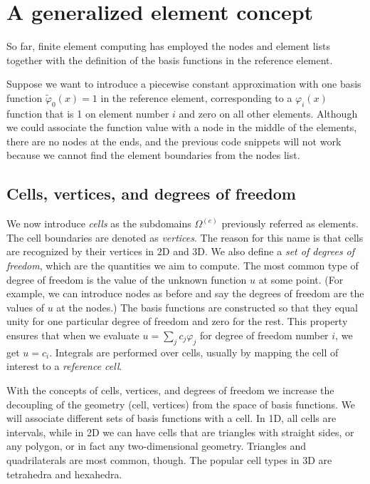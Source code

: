 \documentclass[../main.tex]{subfiles}
\begin{document}
	\chapter{A generalized element concept}
	\label{chap:chap_6}
	\noindent So far, finite element computing has employed the nodes and element lists
	together with the definition of the basis functions in the reference element.
	
	Suppose we want to introduce a piecewise constant approximation with one basis function $\tilde{\varphi}_{0}(x)=1$ in the reference element, corresponding to a $\varphi_{i}(x)$ function that is 1 on element number $i$ and zero on all other elements. Although we could associate the function value with a node in the middle of the elements, there are no nodes at the ends, and the previous code snippets will not work because we cannot find the element boundaries from the nodes list.
	\section[Cells, vertices, and degrees of freedom]{Cells, vertices, and degrees of freedom}
	\label{sec:sec_6_1}
	We now introduce \textit{cells} as the subdomains $\Omega^{(e)}$ previously referred as elements. The cell boundaries are denoted as \textit{vertices}. The reason for this name is that cells are recognized by their vertices in $2 \mathrm{D}$ and 3D. We also define a \textit{set of degrees of freedom}, which are the quantities we aim to compute. The most common type of degree of freedom is the value of the unknown function $u$ at some point. (For example, we can introduce nodes as before and say the degrees of freedom are the values of $u$ at the nodes.) The basis functions are constructed so that they equal unity for one particular degree of freedom and zero for the rest. This property ensures that when we evaluate $u=\sum_{j} c_{j} \varphi_{j}$ for degree of freedom number $i$, we get $u=c_{i}$. Integrals are performed over cells, usually by mapping the cell of interest to a \textit{reference cell}.
	
	With the concepts of cells, vertices, and degrees of freedom we increase the decoupling of the geometry (cell, vertices) from the space of basis functions. We will associate different sets of basis functions with a cell. In 1D, all cells are intervals, while in 2D we can have cells that are triangles with straight sides, or any polygon, or in fact any two-dimensional geometry. Triangles and quadrilaterals are most common, though. The popular cell types in $3 \mathrm{D}$ are tetrahedra and hexahedra.
\end{document}
